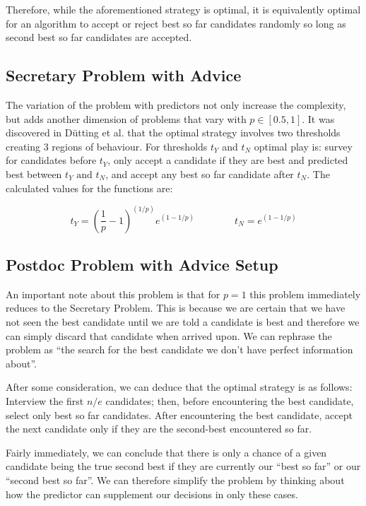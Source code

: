 \documentclass[a4paper,11pt]{article}
\begin{document}
Therefore, while the aforementioned strategy is optimal, it is equivalently optimal for an algorithm to accept or reject best so far candidates randomly so long as second best so far candidates are accepted.

\subsection{Secretary Problem with Advice}

The variation of the problem with predictors not only increase the complexity, but adds another dimension of problems that vary with $p \in [0.5,1]$. It was discovered in D\"utting et al. \cite{dütting2020secretariesadvice} that the optimal strategy involves two thresholds creating 3 regions of behaviour. For thresholds $t_Y$ and $t_N$ optimal play is: survey for candidates before $t_Y$, only accept a candidate if they are best and predicted best between $t_Y \text{ and } t_N$, and accept any best so far candidate after $t_N$. The calculated values for the functions are:

$$
t_Y = \left(\frac{1}{p}-1\right)^{(1/p)}e^{\left(1-1/p\right)} \hspace{4em} t_N = e^{\left(1-1/p\right)}
$$

\subsection{Postdoc Problem with Advice Setup}
An important note about this problem is that for $p = 1$ this problem immediately reduces to the Secretary Problem. This is because we are certain that we have not seen the best candidate until we are told a candidate is best and therefore we can simply discard that candidate when arrived upon. We can rephrase the problem as ``the search for the best candidate we don't have perfect information about''.

After some consideration, we can deduce that the optimal strategy is as follows: Interview the first $n/e$ candidates; then, before encountering the best candidate, select only best so far candidates. After encountering the best candidate, accept the next candidate only if they are the second-best encountered so far.

Fairly immediately, we can conclude that there is only a chance of a given candidate being the true second best if they are currently our ``best so far'' or our ``second best so far''. We can therefore simplify the problem by thinking about how the predictor can supplement our decisions in only these cases.
\end{document}
